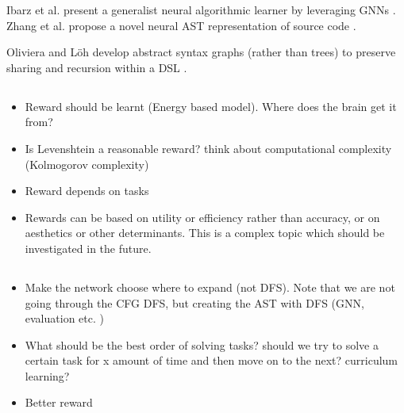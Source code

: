 Ibarz et al. present a generalist neural algorithmic learner by leveraging GNNs \cite{ibarz2022generalist}.
Zhang et al. propose a novel neural AST representation of source code \cite{zhang_novel_2019}.

Oliviera and Löh develop abstract syntax graphs (rather than trees) to preserve sharing and recursion within a DSL \cite{oliveira_abstract_2013}.









\subsection{}

\begin{itemize}
    \item Reward should be learnt (Energy based model). Where does the brain get it from?
    \item Is Levenshtein a reasonable reward? think about computational complexity (Kolmogorov complexity)
    \item Reward depends on tasks
    \item Rewards can be based on utility or efficiency rather than accuracy, or on aesthetics or other determinants. This is a complex topic which should be investigated in the future. 
\end{itemize}






\subsection{}
\begin{itemize}
    \item Make the network choose where to expand (not DFS). Note that we are not going through the CFG DFS, but creating the AST with DFS (GNN, evaluation etc. )
    \item What should be the best order of solving tasks? should we try to solve a certain task for x amount of time and then move on to the next? curriculum learning? 
    \item Better reward
\end{itemize}









